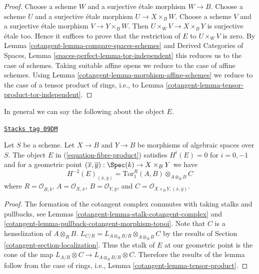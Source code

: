 \begin{proof}

Choose a scheme $W$ and a surjective \'etale morphism $W \to B$.
Choose a scheme $U$ and a surjective \'etale morphism $U \to X \times_B W$.
Choose a scheme $V$ and a surjective \'etale morphism $V \to Y \times_B W$.
Then $U \times_W V \to X \times_B Y$ is surjective \'etale too.
Hence it suffices to prove that the restriction of $E$ to $U \times_W V$
is zero. By Lemma \ref{cotangent-lemma-compare-spaces-schemes} and
Derived Categories of Spaces, Lemma \ref{spaces-perfect-lemma-tor-independent}
this reduces us to the case of schemes.
Taking suitable affine opens we reduce to the case of affine schemes.
Using
Lemma \ref{cotangent-lemma-morphism-affine-schemes}
we reduce to the case of a tensor product of rings, i.e., to
Lemma \ref{cotangent-lemma-tensor-product-tor-independent}.
\end{proof}

In general we can say the following about the object $E$.

\begin{lemma}
\label{cotangent-lemma-fibre-product}
\href{https://stacks.math.columbia.edu/tag/09DM}{\texttt{Stacks tag 09DM}}

Let $S$ be a scheme. Let $X \to B$ and $Y \to B$ be morphisms of algebraic
spaces over $S$. The object $E$ in (\ref{equation-fibre-product}) satisfies
$H^i(E) = 0$ for $i = 0, -1$ and for a geometric point
$(\overline{x}, \overline{y}) : \Spec(k) \to X \times_B Y$ we have
$$
H^{-2}(E)_{(\overline{x}, \overline{y})} =
\text{Tor}_1^R(A, B) \otimes_{A \otimes_R B} C
$$
where $R = \mathcal{O}_{B, \overline{b}}$, $A = \mathcal{O}_{X, \overline{x}}$,
$B = \mathcal{O}_{Y, \overline{y}}$, and
$C = \mathcal{O}_{X \times_B Y, (\overline{x}, \overline{y})}$.
\end{lemma}

\begin{proof}

The formation of the cotangent complex commutes with taking stalks
and pullbacks, see
Lemmas \ref{cotangent-lemma-stalk-cotangent-complex} and
\ref{cotangent-lemma-pullback-cotangent-morphism-topoi}.
Note that $C$ is a henselization of $A \otimes_R B$.
$L_{C/R} = L_{A \otimes_R B/R} \otimes_{A \otimes_R B} C$
by the results of Section \ref{cotangent-section-localization}.
Thus the stalk of $E$ at our geometric point is the cone of the
map $L_{A/R} \otimes C \to L_{A \otimes_R B/R} \otimes C$.
Therefore the results of the lemma follow from
the case of rings, i.e., Lemma \ref{cotangent-lemma-tensor-product}.
\end{proof}



